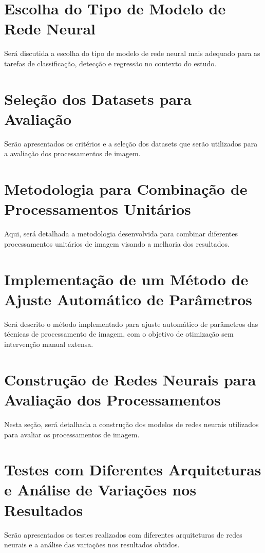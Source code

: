 \section{Escolha do Tipo de Modelo de Rede Neural}
Será discutida a escolha do tipo de modelo de rede neural mais adequado para as tarefas de classificação, detecção e regressão no contexto do estudo.

\section{Seleção dos Datasets para Avaliação}
Serão apresentados os critérios e a seleção dos datasets que serão utilizados para a avaliação dos processamentos de imagem.

\section{Metodologia para Combinação de Processamentos Unitários}
Aqui, será detalhada a metodologia desenvolvida para combinar diferentes processamentos unitários de imagem visando a melhoria dos resultados.

\section{Implementação de um Método de Ajuste Automático de Parâmetros}
Será descrito o método implementado para ajuste automático de parâmetros das técnicas de processamento de imagem, com o objetivo de otimização sem intervenção manual extensa.

\section{Construção de Redes Neurais para Avaliação dos Processamentos}
Nesta seção, será detalhada a construção dos modelos de redes neurais utilizados para avaliar os processamentos de imagem.

\section{Testes com Diferentes Arquiteturas e Análise de Variações nos Resultados}
Serão apresentados os testes realizados com diferentes arquiteturas de redes neurais e a análise das variações nos resultados obtidos.
